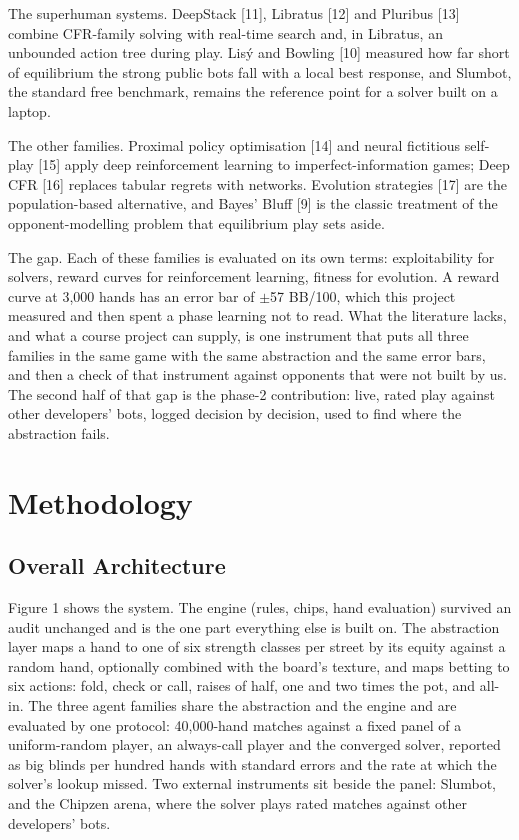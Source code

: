 \documentclass[runningheads]{llncs}
\begin{document}
The superhuman systems. DeepStack [11], Libratus [12] and Pluribus [13] combine CFR-family solving with real-time search and, in Libratus, an unbounded action tree during play. Lisý and Bowling [10] measured how far short of equilibrium the strong public bots fall with a local best response, and Slumbot, the standard free benchmark, remains the reference point for a solver built on a laptop.

The other families. Proximal policy optimisation [14] and neural fictitious self-play [15] apply deep reinforcement learning to imperfect-information games; Deep CFR [16] replaces tabular regrets with networks. Evolution strategies [17] are the population-based alternative, and Bayes' Bluff [9] is the classic treatment of the opponent-modelling problem that equilibrium play sets aside.

The gap. Each of these families is evaluated on its own terms: exploitability for solvers, reward curves for reinforcement learning, fitness for evolution. A reward curve at 3,000 hands has an error bar of $\pm$57 BB/100, which this project measured and then spent a phase learning not to read. What the literature lacks, and what a course project can supply, is one instrument that puts all three families in the same game with the same abstraction and the same error bars, and then a check of that instrument against opponents that were not built by us. The second half of that gap is the phase-2 contribution: live, rated play against other developers' bots, logged decision by decision, used to find where the abstraction fails.

\section{Methodology}
\subsection{Overall Architecture}
Figure 1 shows the system. The engine (rules, chips, hand evaluation) survived an audit unchanged and is the one part everything else is built on. The abstraction layer maps a hand to one of six strength classes per street by its equity against a random hand, optionally combined with the board's texture, and maps betting to six actions: fold, check or call, raises of half, one and two times the pot, and all-in. The three agent families share the abstraction and the engine and are evaluated by one protocol: 40,000-hand matches against a fixed panel of a uniform-random player, an always-call player and the converged solver, reported as big blinds per hundred hands with standard errors and the rate at which the solver's lookup missed. Two external instruments sit beside the panel: Slumbot, and the Chipzen arena, where the solver plays rated matches against other developers' bots.
\end{document}
